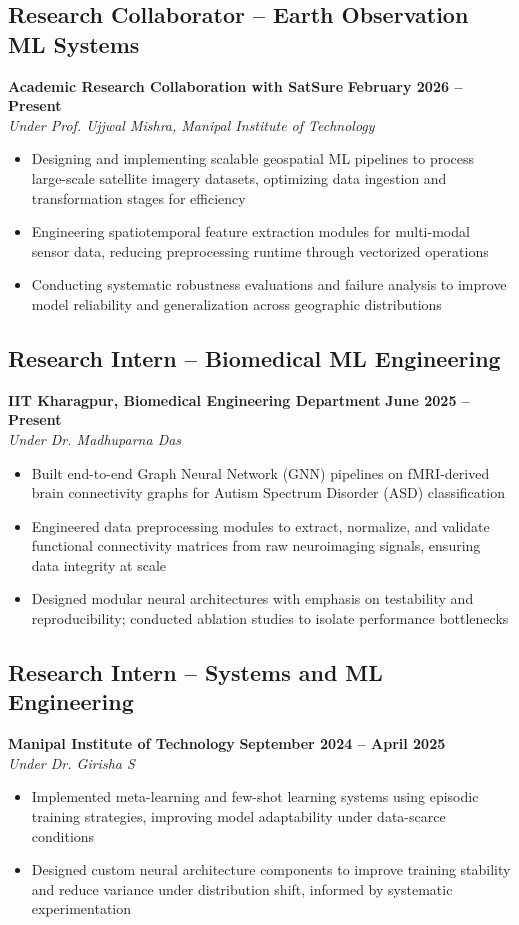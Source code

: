 \documentclass[a4paper,11pt]{article}
\begin{document}
\subsection{Research Collaborator -- Earth Observation ML Systems}
\textbf{Academic Research Collaboration with SatSure} \hfill \textbf{February 2026 -- Present} \\
\textit{Under Prof. Ujjwal Mishra, Manipal Institute of Technology}
\begin{itemize}[leftmargin=15pt, itemsep=1pt]
    \item Designing and implementing scalable geospatial ML pipelines to process large-scale satellite imagery datasets, optimizing data ingestion and transformation stages for efficiency
    \item Engineering spatiotemporal feature extraction modules for multi-modal sensor data, reducing preprocessing runtime through vectorized operations
    \item Conducting systematic robustness evaluations and failure analysis to improve model reliability and generalization across geographic distributions
\end{itemize}

\subsection{Research Intern -- Biomedical ML Engineering}
\textbf{IIT Kharagpur, Biomedical Engineering Department} \hfill \textbf{June 2025 -- Present} \\
\textit{Under Dr. Madhuparna Das}
\begin{itemize}[leftmargin=15pt, itemsep=1pt]
    \item Built end-to-end Graph Neural Network (GNN) pipelines on fMRI-derived brain connectivity graphs for Autism Spectrum Disorder (ASD) classification
    \item Engineered data preprocessing modules to extract, normalize, and validate functional connectivity matrices from raw neuroimaging signals, ensuring data integrity at scale
    \item Designed modular neural architectures with emphasis on testability and reproducibility; conducted ablation studies to isolate performance bottlenecks
\end{itemize}

\subsection{Research Intern -- Systems and ML Engineering}
\textbf{Manipal Institute of Technology} \hfill \textbf{September 2024 -- April 2025} \\
\textit{Under Dr. Girisha S}
\begin{itemize}[leftmargin=15pt, itemsep=1pt]
    \item Implemented meta-learning and few-shot learning systems using episodic training strategies, improving model adaptability under data-scarce conditions
    \item Designed custom neural architecture components to improve training stability and reduce variance under distribution shift, informed by systematic experimentation
\end{itemize}
\end{document}
